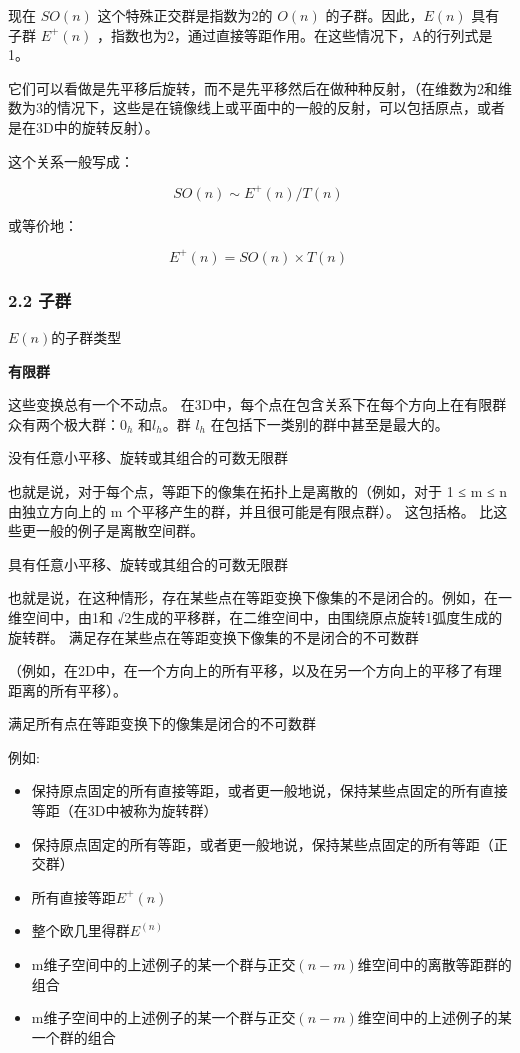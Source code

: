 现在 $SO(n)$ 这个特殊正交群是指数为2的 $O(n)$ 的子群。因此，$E(n)$ 具有子群 $E^{+}(n)$ ，指数也为2，通过直接等距作用。在这些情况下，A的行列式是1。

它们可以看做是先平移后旋转，而不是先平移然后在做种种反射，（在维数为2和维数为3的情况下，这些是在镜像线上或平面中的一般的反射，可以包括原点，或者是在3D中的旋转反射）。

这个关系一般写成：

\begin{equation}
SO(n) \sim E^+(n)/T(n)~
\end{equation}

或等价地：

\begin{equation}
E^{+}(n) = SO(n) \times T(n)~
\end{equation}



\subsubsection{2.2 子群}

$E(n)$的子群类型

\textbf{有限群}

这些变换总有一个不动点。 在3D中，每个点在包含关系下在每个方向上在有限群众有两个极大群：$0_h$ 和$l_h$。群 $l_h$ 在包括下一类别的群中甚至是最大的。

没有任意小平移、旋转或其组合的可数无限群

也就是说，对于每个点，等距下的像集在拓扑上是离散的（例如，对于 1 ≤ m ≤ n 由独立方向上的 m 个平移产生的群，并且很可能是有限点群）。 这包括格。 比这些更一般的例子是离散空间群。

具有任意小平移、旋转或其组合的可数无限群

也就是说，在这种情形，存在某些点在等距变换下像集的不是闭合的。例如，在一维空间中，由1和 √2生成的平移群，在二维空间中，由围绕原点旋转1弧度生成的旋转群。
满足存在某些点在等距变换下像集的不是闭合的不可数群

（例如，在2D中，在一个方向上的所有平移，以及在另一个方向上的平移了有理距离的所有平移）。

满足所有点在等距变换下的像集是闭合的不可数群

例如:

\begin{itemize}
\item 保持原点固定的所有直接等距，或者更一般地说，保持某些点固定的所有直接等距（在3D中被称为旋转群）
\item 保持原点固定的所有等距，或者更一般地说，保持某些点固定的所有等距（正交群）
\item 所有直接等距$E^+(n)$
\item 整个欧几里得群$E^(n)$
\item m维子空间中的上述例子的某一个群与正交$(n-m)$维空间中的离散等距群的组合
\item m维子空间中的上述例子的某一个群与正交$(n-m)$维空间中的上述例子的某一个群的组合
\end{itemize}

